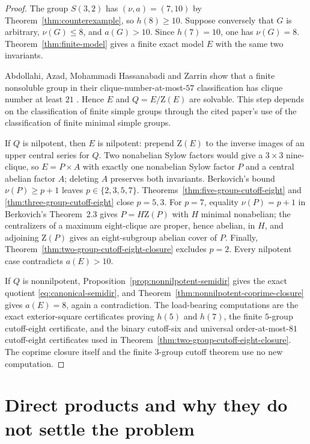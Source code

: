 \documentclass[11pt]{article}
\theoremstyle{remark}
\newcommand{\nuG}{\nu}
\newcommand{\aG}{a}
\newcommand{\Z}{\mathrm Z}
\begin{document}
\begin{proof}
The group $S(3,2)$ has $(\nuG,\aG)=(7,10)$ by
Theorem~\ref{thm:counterexample}, so $h(8)\ge10$.  Suppose conversely that
$G$ is arbitrary, $\nuG(G)\le8$, and $\aG(G)>10$.  Since $h(7)=10$, one
has $\nuG(G)=8$.  Theorem~\ref{thm:finite-model} gives a finite exact model
$E$ with the same two invariants.

Abdollahi, Azad, Mohammadi Hassanabadi and Zarrin show that a finite
nonsoluble group in their clique-number-at-most-$57$ classification has
clique number at least $21$
\cite[Theorem~1.1, author-manuscript p.~2; proof pp.~4--9]
{abdollahi_azad_hassanabadi_zarrin_2010}.  Hence $E$ and
$Q=E/\Z(E)$ are solvable.  This step depends on the classification of
finite simple groups through the cited paper's use of the classification of
finite minimal simple groups.

If $Q$ is nilpotent, then $E$ is nilpotent: prepend $\Z(E)$ to the inverse
images of an upper central series for $Q$.  Two nonabelian Sylow factors
would give a $3\times3$ nine-clique, so $E=P\times A$ with exactly one
nonabelian Sylow factor $P$ and a central abelian factor $A$; deleting $A$
preserves both invariants.  Berkovich's bound
$\nuG(P)\ge p+1$ \cite[Lemma~1.2, p.~416]{berkovich_2010_covers} leaves
$p\in\{2,3,5,7\}$.  Theorems~\ref{thm:five-group-cutoff-eight} and
\ref{thm:three-group-cutoff-eight} close $p=5,3$.  For $p=7$, equality
$\nuG(P)=p+1$ in Berkovich's Theorem~2.3
\cite[pp.~419--420]{berkovich_2010_covers} gives
$P=H\Z(P)$ with $H$ minimal nonabelian; the centralizers of a maximum
eight-clique are proper, hence abelian, in $H$, and adjoining $\Z(P)$ gives
an eight-subgroup abelian cover of $P$.  Finally,
Theorem~\ref{thm:two-group-cutoff-eight-closure} excludes $p=2$.  Every
nilpotent case contradicts $\aG(E)>10$.

If $Q$ is nonnilpotent, Proposition~\ref{prop:nonnilpotent-semidir} gives
the exact quotient \eqref{eq:canonical-semidir}, and
Theorem~\ref{thm:nonnilpotent-coprime-closure} gives $\aG(E)=8$, again a
contradiction.  The load-bearing computations are the exact exterior-square
certificates proving $h(5)$ and $h(7)$, the finite $5$-group
cutoff-eight certificate, and the binary cutoff-six and universal
order-at-most-$81$ cutoff-eight certificates used in
Theorem~\ref{thm:two-group-cutoff-eight-closure}.  The coprime closure itself
and the finite $3$-group cutoff theorem use no new computation.
\end{proof}

\section{Direct products and why they do not settle the problem}
\end{document}
